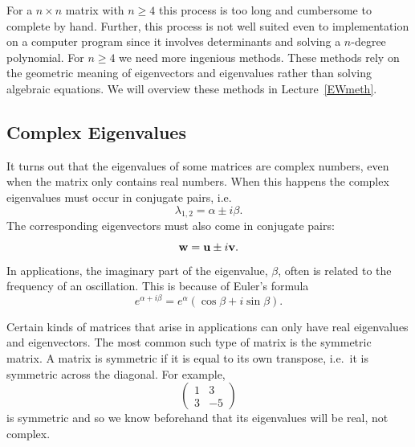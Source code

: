 For a $n \times n$ matrix with $n \ge 4$ this process is too
long and cumbersome to complete by hand. Further, this process
is not well suited even to implementation on a computer program
since it involves determinants and solving a $n$-degree polynomial.
For $n \ge 4$ we need more ingenious methods. These methods rely
on the geometric meaning of eigenvectors and eigenvalues rather than solving
algebraic equations. We will overview these methods in Lecture~\ref{EWmeth}.




\subsection*{Complex Eigenvalues}

It turns out that the eigenvalues of some matrices are complex
numbers, even when the matrix only contains real numbers.
When this happens the complex eigenvalues must occur
in conjugate pairs, i.e.
$$
    \lambda_{1,2} = \alpha \pm i \beta.
$$
The corresponding eigenvectors must also come
in conjugate pairs:
$$
     \mathbf{w} = \mathbf{u} \pm i \mathbf{v}.
$$
In applications, the imaginary part of the eigenvalue, $\beta$,
often is related to the frequency of an oscillation.
This is because of Euler's formula
$$
    e^{\alpha + i \beta} = e^\alpha(\cos \beta + i \sin \beta).
$$

Certain kinds of matrices that arise in applications can only
have real eigenvalues and eigenvectors. The most common such type of matrix
is the symmetric matrix. A matrix is symmetric if it is equal
to its own transpose, i.e.~it is symmetric across the diagonal.
For example,
$$
\left(\begin{array}{cc} 1 & 3 \\
                        3 & -5
                    \end{array} \right)
$$
is symmetric and so we know beforehand that its eigenvalues will be real,
not complex.



